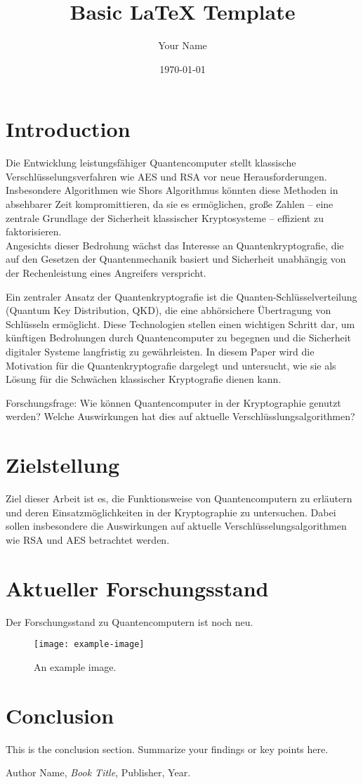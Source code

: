 \documentclass[12pt]{article} %
\title{Basic LaTeX Template}
\author{Your Name}
\date{\today}
\begin{document}
\maketitle

\section{Introduction}
Die Entwicklung leistungsfähiger Quantencomputer stellt klassische Verschlüsselungsverfahren wie AES 
und RSA vor neue Herausforderungen. Insbesondere Algorithmen wie Shors Algorithmus könnten diese Methoden 
in absehbarer Zeit kompromittieren, da sie es ermöglichen, große Zahlen – eine zentrale Grundlage der 
Sicherheit klassischer Kryptosysteme – effizient zu faktorisieren. \\
Angesichts dieser Bedrohung 
wächst das Interesse an Quantenkryptografie, die auf den Gesetzen der Quantenmechanik basiert 
und Sicherheit unabhängig von der Rechenleistung eines Angreifers verspricht.

Ein zentraler Ansatz der Quantenkryptografie ist die Quanten-Schlüsselverteilung (Quantum Key Distribution, QKD), die eine abhörsichere Übertragung von Schlüsseln ermöglicht. Diese Technologien stellen einen wichtigen Schritt dar, um künftigen Bedrohungen durch Quantencomputer zu begegnen und die Sicherheit digitaler Systeme langfristig zu gewährleisten. In diesem Paper wird die Motivation für die Quantenkryptografie dargelegt und untersucht, wie sie als Lösung für die Schwächen klassischer Kryptografie dienen kann.

Forschungsfrage: 
Wie können Quantencomputer in der Kryptographie genutzt werden?
Welche Auswirkungen hat dies auf aktuelle Verschlüsslungsalgorithmen?

\section{Zielstellung}
Ziel dieser Arbeit ist es, die Funktionsweise von Quantencomputern zu erläutern und deren 
Einsatzmöglichkeiten in der Kryptographie zu untersuchen. Dabei sollen insbesondere die Auswirkungen 
auf aktuelle Verschlüsselungsalgorithmen wie RSA und AES betrachtet werden.

\section{Aktueller Forschungsstand}
Der Forschungsstand zu Quantencomputern ist noch neu. 
\begin{figure}[h!]
\centering
\texttt{[image: example-image]} %
\caption{An example image.}
\label{fig:example}
\end{figure}

\section{Conclusion}
This is the conclusion section. Summarize your findings or key points here.

\begin{thebibliography}{9}
 Author Name, \textit{Book Title}, Publisher, Year.
\end{thebibliography}
\end{document}

